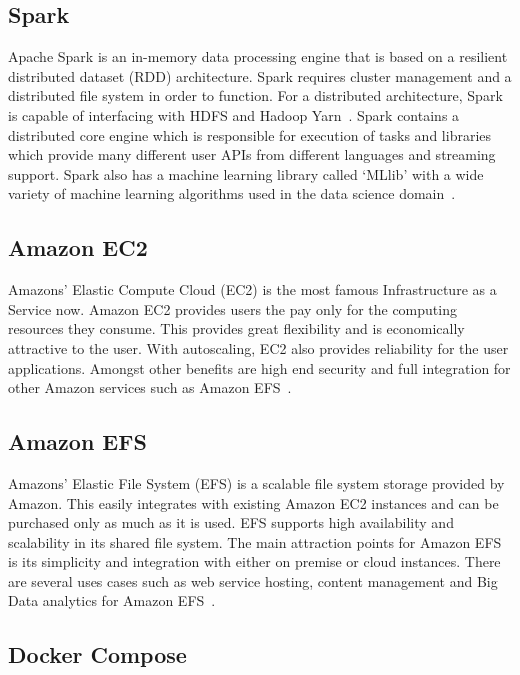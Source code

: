 \subsection{Spark}

Apache Spark is an in-memory data processing engine that is based on a 
resilient distributed dataset (RDD) architecture. Spark requires cluster 
management and a distributed file system in order to function. For a 
distributed architecture, Spark is capable of interfacing with HDFS and Hadoop 
Yarn~\cite{hid-sp18-416-www-spark-wikipedia}. Spark contains a distributed 
core engine which is responsible for execution of tasks and libraries which 
provide many different user APIs from different languages and streaming 
support. Spark also has a machine learning library called `MLlib' with a wide 
variety of machine learning algorithms used in the data science 
domain~\cite{hid-sp18-416-www-spark-hortonworks-blog}.

\subsection{Amazon EC2}

Amazons' Elastic Compute Cloud (EC2) is the most famous Infrastructure as a 
Service now. Amazon EC2 provides users the pay only for the computing 
resources they consume. This provides great flexibility and is economically 
attractive to the user. With autoscaling, EC2 also provides reliability for 
the user applications. Amongst other benefits are high end security and full 
integration for other Amazon services such as Amazon 
EFS~\cite{hid-sp18-416-www-amazon-ec2}. 

\subsection{Amazon EFS}

Amazons' Elastic File System (EFS) is a scalable file system storage provided 
by Amazon. This easily integrates with existing Amazon EC2 instances and can 
be purchased only as much as it is used. EFS supports high availability and 
scalability in its shared file system. The main attraction points for Amazon 
EFS is its simplicity and integration with either on premise or cloud 
instances. There are several uses cases such as web service hosting, content 
management and Big Data analytics for Amazon 
EFS~\cite{hid-sp18-416-www-amazon-efs}. 

\subsection{Docker Compose}

